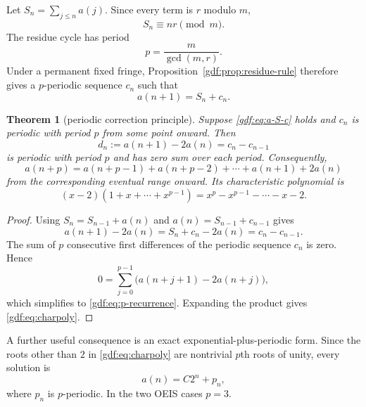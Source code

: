 \documentclass[11pt,a4paper]{article}
\numberwithin{equation}{section}
\newtheorem{theorem}{Theorem}[section]
\theoremstyle{definition}
\theoremstyle{remark}
\theoremstyle{plain}
\begin{document}
Let $S_n=\sum_{j\le n}a(j)$.  Since every term is $r$ modulo $m$,
\begin{equation}\label{gdf:eq:S-residue}
 S_n\equiv nr\pmod m.
\end{equation}
The residue cycle has period
\begin{equation}\label{gdf:eq:p-period}
 p=\frac{m}{\gcd(m,r)}.
\end{equation}
Under a permanent fixed fringe, Proposition~\ref{gdf:prop:residue-rule} therefore
gives a $p$-periodic sequence $c_n$ such that
\begin{equation}\label{gdf:eq:a-S-c}
 a(n+1)=S_n+c_n.
\end{equation}

\begin{theorem}[periodic correction principle]\label{gdf:thm:periodic-principle}
Suppose \eqref{gdf:eq:a-S-c} holds and $c_n$ is periodic with period $p$ from some
point onward.  Then
\begin{equation}\label{gdf:eq:d-c-difference}
 d_n:=a(n+1)-2a(n)=c_n-c_{n-1}
\end{equation}
is periodic with period $p$ and has zero sum over each period.  Consequently,
\begin{equation}\label{gdf:eq:p-recurrence}
 a(n+p)=a(n+p-1)+a(n+p-2)+\cdots+a(n+1)+2a(n)
\end{equation}
from the corresponding eventual range onward.  Its characteristic polynomial
is
\begin{equation}\label{gdf:eq:charpoly}
 (x-2)(1+x+\cdots+x^{p-1})
 =x^p-x^{p-1}-\cdots-x-2.
\end{equation}
\end{theorem}

\begin{proof}
Using $S_n=S_{n-1}+a(n)$ and
$a(n)=S_{n-1}+c_{n-1}$ gives
\[
 a(n+1)-2a(n)=S_n+c_n-2a(n)=c_n-c_{n-1}.
\]
The sum of $p$ consecutive first differences of the periodic sequence $c_n$
is zero.  Hence
\[
 0=\sum_{j=0}^{p-1}\bigl(a(n+j+1)-2a(n+j)\bigr),
\]
which simplifies to \eqref{gdf:eq:p-recurrence}.  Expanding the product gives
\eqref{gdf:eq:charpoly}.
\end{proof}

A further useful consequence is an exact exponential-plus-periodic form.
Since the roots other than $2$ in \eqref{gdf:eq:charpoly} are nontrivial
$p$th roots of unity, every solution is
\begin{equation}\label{gdf:eq:exp-periodic-general}
 a(n)=C2^n+p_n,
\end{equation}
where $p_n$ is $p$-periodic.  In the two OEIS cases $p=3$.
\end{document}
